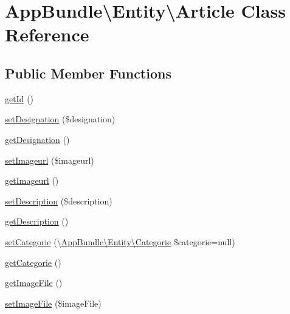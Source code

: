 \hypertarget{class_app_bundle_1_1_entity_1_1_article}{}\section{App\+Bundle\textbackslash{}Entity\textbackslash{}Article Class Reference}
\label{class_app_bundle_1_1_entity_1_1_article}
\subsection*{Public Member Functions}
\begin{DoxyCompactItemize}
\item 
\hyperlink{class_app_bundle_1_1_entity_1_1_article_a581de11c7b8a1f406547385bfbb6ab27}{get\+Id} ()
\item 
\hyperlink{class_app_bundle_1_1_entity_1_1_article_a514464b95462c2c45d39a856529f5627}{set\+Designation} (\$designation)
\item 
\hyperlink{class_app_bundle_1_1_entity_1_1_article_ad16c7c1dc8f42d8b3c45111acac8c1cf}{get\+Designation} ()
\item 
\hyperlink{class_app_bundle_1_1_entity_1_1_article_a0b3027f00ceefc77c43b349dac51732e}{set\+Imageurl} (\$imageurl)
\item 
\hyperlink{class_app_bundle_1_1_entity_1_1_article_a07e4c389352b30c04586c697eb0ac47b}{get\+Imageurl} ()
\item 
\hyperlink{class_app_bundle_1_1_entity_1_1_article_a2e1cff9c966b564aba6ea7bec4ea4757}{set\+Description} (\$description)
\item 
\hyperlink{class_app_bundle_1_1_entity_1_1_article_a0772628bb9ddfaebc029ec170740c41b}{get\+Description} ()
\item 
\hyperlink{class_app_bundle_1_1_entity_1_1_article_a849b7ee1604e5923b13ba0d3d3d9fa48}{set\+Categorie} (\textbackslash{}\hyperlink{class_app_bundle_1_1_entity_1_1_categorie}{App\+Bundle\textbackslash{}\+Entity\textbackslash{}\+Categorie} \$categorie=null)
\item 
\hyperlink{class_app_bundle_1_1_entity_1_1_article_af96d32366fd47aded0527841b172e23f}{get\+Categorie} ()
\item 
\hyperlink{class_app_bundle_1_1_entity_1_1_article_a32fb5da47a1762e166c99316e9355c79}{get\+Image\+File} ()
\item 
\hyperlink{class_app_bundle_1_1_entity_1_1_article_a6368e998b98c7f9b274539a89ebf7c7e}{set\+Image\+File} (\$image\+File)

\end{DoxyCompactItemize}

